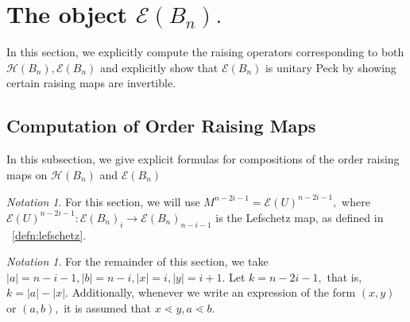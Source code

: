 \documentclass[10 pt]{amsart}
\theoremstyle{plain}
\theoremstyle{definition}
\theoremstyle{remark}
\newtheorem{note}[thm]{Notation}
\numberwithin{equation}{section}
\newcommand\ssec{\subsection}
\begin{document}
\section{The object $\mathcal E(B_n).$}
\label{sec:unitary_peck_f}
In this section, we explicitly compute the raising operators corresponding to both \linebreak $\mathcal H(B_n),\mathcal E(B_n)$ and explicitly show that $\mathcal E(B_n)$ is unitary Peck by showing certain raising maps are invertible.

\ssec{Computation of Order Raising Maps}

In this subsection, we give explicit formulas for compositions of the order raising maps on $\mathcal H(B_n)$ and $\mathcal E(B_n)$

\begin{note}
For this section, we will use $M^{n-2i-1} = \mathcal E(U)^{n-2i-1},$ where $\mathcal E(U)^{n-2i-1}:\mathcal E(B_n)_i \rightarrow \mathcal E(B_n)_{n-i-1}$ is the Lefschetz map, as defined in ~\ref{defn:lefschetz}.
\end{note}
\begin{note}
For the remainder of this section, we take $|a| = n-i-1,|b|= n-i,|x| = i,|y| = i+1.$ Let $k = n-2i-1,$ that is, $k = |a| - |x|.$ Additionally, whenever we write an expression of the form $(x, y)$ or $(a, b),$ it is assumed that $x \lessdot y,a \lessdot b.$
\end{note}
\end{document}
